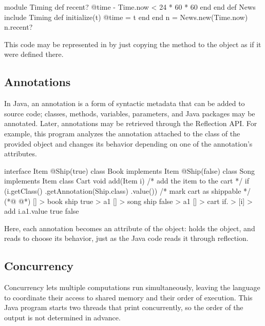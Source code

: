 \begin{ffcode}
module Timing
  def recent?
    @time - Time.now < 24 * 60 * 60
  end
end
def News
  include Timing
  def initialize(t)
    @time = t
  end
end
n = News.new(Time.now)
n.recent?
\end{ffcode}

This code may be represented in \eolang{} by just copying
  the method  to the object  as if it were defined there.

\subsection{Annotations}
\label{sec:annotations}

In Java, an annotation is a form of syntactic metadata
  that can be added to source code; classes, methods, variables, parameters,
  and Java packages may be annotated.
Later, annotations may be retrieved through the Reflection API.
For example, this program analyzes the annotation attached to the class
  of the provided object and changes its behavior depending
  on one of the annotation's attributes.

\begin{ffcode}
interface Item {}
@Ship(true)
class Book implements Item {}
@Ship(false)
class Song implements Item {}
class Cart {
  void add(Item i) {
    /* add the item to the cart */
    if (i.getClass()
      .getAnnotation(Ship.class)
      .value()) {
      /* mark cart as shippable */
    }
  }
}
(*@ \ffcolumnbreak @*)
[] > book
  ship true > a1
[] > song
  ship false > a1
[] > cart
  if. > [i] > add
    i.a1.value
      true
      false
\end{ffcode}

Here, each annotation becomes an attribute of the object:  holds
  the  object, and  reads  to choose
  its behavior, just as the Java code reads it through reflection.

\subsection{Concurrency}
\label{sec:concurrency}

\broken

Concurrency lets multiple computations run simultaneously, leaving the
  language to coordinate their access to shared memory and their order
  of execution.
This Java program starts two threads that print concurrently,
  so the order of the output is not determined in advance.

